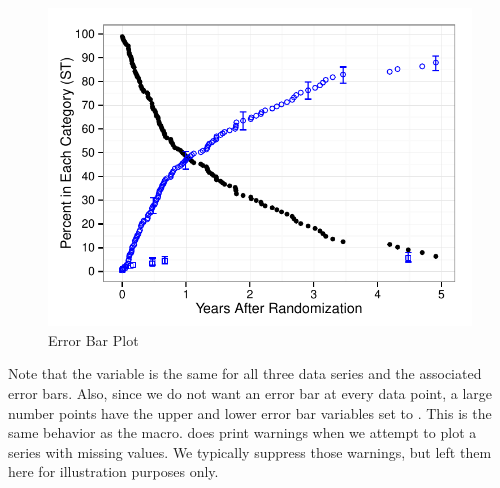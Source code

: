 \documentclass[nojss]{jss}\usepackage[]{graphicx}\usepackage[]{color}
\makeatletter
\def\maxwidth{ %
  \ifdim\Gin@nat@width>\linewidth
    \linewidth
  \else
    \Gin@nat@width
  \fi
}
\newenvironment{knitrout}{}{} %
\makeatother
\begin{document}
\begin{knitrout}
\begin{figure}[htpb]
{\centering \includegraphics[width=\maxwidth]{figure/beamer-errorBars} 

}

\caption[Error Bar Plot]{Error Bar Plot\label{F:errorBars}}
\end{figure}


\end{knitrout}

Note that the  variable is the same for all three data series and the associated error bars. Also, since we do not want an error bar at every data point, a large number points have the upper and lower error bar variables set to . This is the same behavior as the  macro.  does print warnings when we attempt to plot a series with missing values. We typically suppress those warnings, but left them here for illustration purposes only.
\end{document}
